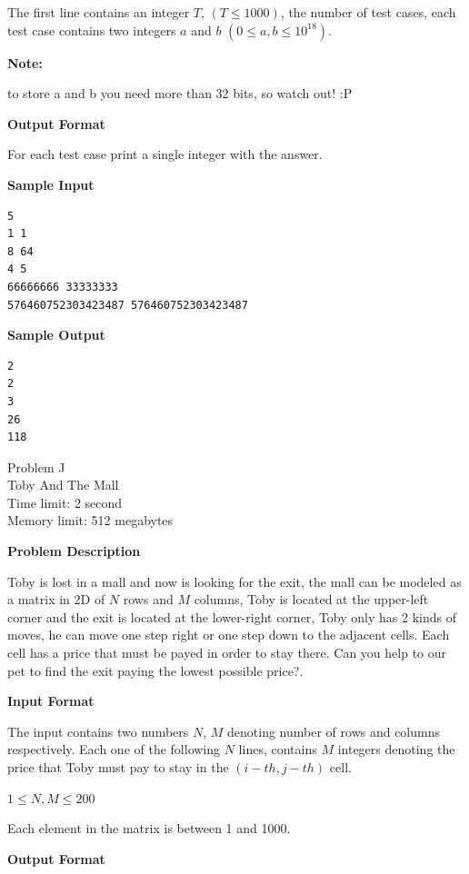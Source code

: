 \documentclass[11pt]{article}
\begin{document}
The first line contains an integer $T$, $(T \le 1000)$, the number of test cases,
each test case contains two integers $a$ and $b$ $(0 \le a,b \le 10^{18})$.

\textbf{\large Note:}

to store a and b you need more than 32 bits, so watch out! :P

\textbf{\large Output Format}

For each test case print a single integer with the answer.

\textbf{\large Sample Input}

\begin{verbatim}
5
1 1
8 64
4 5
66666666 33333333
576460752303423487 576460752303423487
\end{verbatim}

\textbf{\large Sample Output}

\begin{verbatim}
2
2
3
26
118
\end{verbatim}

\newpage

        \begin{center}
            {\LARGE Problem J}\\
            {\Large Toby And The Mall}\\
            {Time limit: 2 second}\\
            {Memory limit: 512 megabytes}
        \end{center}\textbf{\large Problem Description}

Toby is lost in a mall and now is looking for the exit, the mall can be modeled
as a matrix in 2D of $N$ rows and $M$ columns, Toby is located at the upper-left
corner and the exit is located at the lower-right corner, Toby only has 2
kinds of moves, he can move one step right or one step down to the adjacent
cells. Each cell has a price that must be payed in order to stay there.
Can you help to our pet to find the exit paying the lowest possible price?.

\textbf{\large Input Format}

The input contains two numbers $N$, $M$ denoting number of rows and columns respectively.
Each one of the following $N$ lines, contains $M$ integers denoting the price that
Toby must pay to stay in the $(i-th, j-th)$ cell.

$1 \le N, M \le 200$

Each element in the matrix is between 1 and 1000.

\textbf{\large Output Format}
\end{document}
